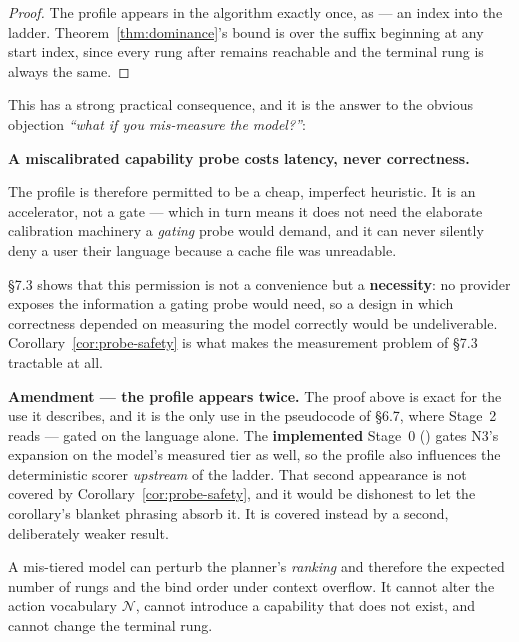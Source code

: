 \begin{proof}
The profile appears in the algorithm exactly once, as  --- an index
into the ladder. Theorem~\ref{thm:dominance}'s bound is over the suffix
beginning at any start index, since every rung after  remains
reachable and the terminal rung is always the same.
\end{proof}

This has a strong practical consequence, and it is the answer to the obvious
objection \emph{``what if you mis-measure the model?''}:

\begin{keyinsight}
\textbf{A miscalibrated capability probe costs latency, never correctness.}
\end{keyinsight}

The profile is therefore permitted to be a cheap, imperfect heuristic. It is an
accelerator, not a gate --- which in turn means it does not need the elaborate
calibration machinery a \emph{gating} probe would demand, and it can never
silently deny a user their language because a cache file was unreadable.

\S7.3 shows that this permission is not a convenience but a
\textbf{necessity}: no provider exposes the information a gating probe would
need, so a design in which correctness depended on measuring the model
correctly would be undeliverable. Corollary~\ref{cor:probe-safety} is what
makes the measurement problem of \S7.3 tractable at all.

\textbf{Amendment --- the profile appears twice.} The proof above is exact for
the use it describes, and it is the only use in the pseudocode of \S6.7, where
Stage~2 reads  --- gated on the language alone. The
\textbf{implemented} Stage~0 () gates N3's
expansion on the model's measured tier as well, so the profile also influences
the deterministic scorer \emph{upstream} of the ladder. That second appearance
is not covered by Corollary~\ref{cor:probe-safety}, and it would be dishonest
to let the corollary's blanket phrasing absorb it. It is covered instead by a
second, deliberately weaker result.

\begingroup
\renewcommand{\thetheorem}{1\ensuremath{'}}
\def\theHtheorem{1prime}
\begin{corollary}
\label{cor:assist-safety}
A mis-tiered model can perturb the planner's \emph{ranking} and therefore the
expected number of rungs and the bind order under context overflow. It cannot
alter the action vocabulary $\mathcal{N}$, cannot introduce a capability that
does not exist, and cannot change the terminal rung.
\end{corollary}
\endgroup
\setcounter{theorem}{1}

